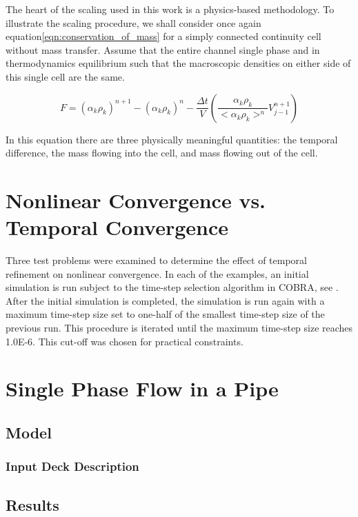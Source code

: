 The heart of the scaling used in this work is a physics-based methodology.
To illustrate the scaling procedure, we shall consider once again equation\ref{eqn:conservation_of_mass} for a simply connected continuity cell without mass transfer.
Assume that the entire channel single phase and in thermodynamics equilibrium such that the macroscopic densities on either side of this single cell are the same.

\begin{equation}
F = \left(\alpha_k \rho_k\right)^{n+1} - \left( \alpha_k \rho_k \right)^n - \frac{\Delta t}{V} \left( \frac{\alpha_k \rho_k }{<\alpha_k \rho_k>^n} V^{n+1}_{j-1} \right)
\end{equation}

In this equation there are three physically meaningful quantities: the temporal difference, the mass flowing into the cell, and mass flowing out of the cell.

\section{Nonlinear Convergence vs. Temporal Convergence}
\label{sect:nonlinear_temporal_convergence}

Three test problems were examined to determine the effect of temporal refinement on nonlinear convergence.
In each of the examples, an initial simulation is run subject to the time-step selection algorithm in COBRA, see .
After the initial simulation is completed, the simulation is run again with a maximum time-step size set to one-half of the smallest time-step size of the previous run.
This procedure is iterated until the maximum time-step size reaches 1.0E-6.
This cut-off was chosen for practical constraints.

\section{Single Phase Flow in a Pipe}
\label{sect:single_numerical_experiment}
\subsection{Model}
\label{subsect:single_model}
\subsubsection{Input Deck Description}
\label{subsect:single_input_deck}
\subsection{Results}
\label{subsect:single_results}

